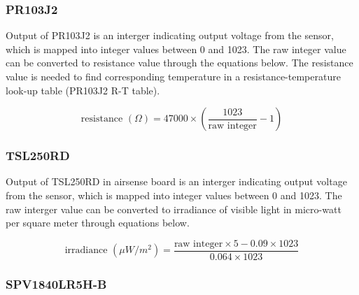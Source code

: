 \subsubsection{ PR103J2}

Output of PR103J2 is an interger indicating output voltage from the sensor, which is mapped into integer values between 0 and 1023. The raw integer value can be converted to resistance value through the equations below. The resistance value is needed to find corresponding temperature in a resistance-temperature look-up table (PR103J2 R-T table).

\bigbreak


{\centering
 \[ \text{resistance } (\Omega) = 47000 \times \left(\frac{1023}{\text{raw integer}} - 1\right) \]
 \par
 }


\subsubsection{ TSL250RD}

Output of TSL250RD in airsense board is an interger indicating output voltage from the sensor, which is mapped into integer values between 0 and 1023. The raw interger value can be converted to irradiance of visible light in micro-watt per square meter through equations below.

\bigbreak

{\centering
\[ \text{irradiance } (\mu W/m^2) = \frac{\text{raw integer} \times 5 - 0.09 \times 1023}{0.064 \times 1023} \]
\par
}




% 

\subsubsection{ SPV1840LR5H-B}

